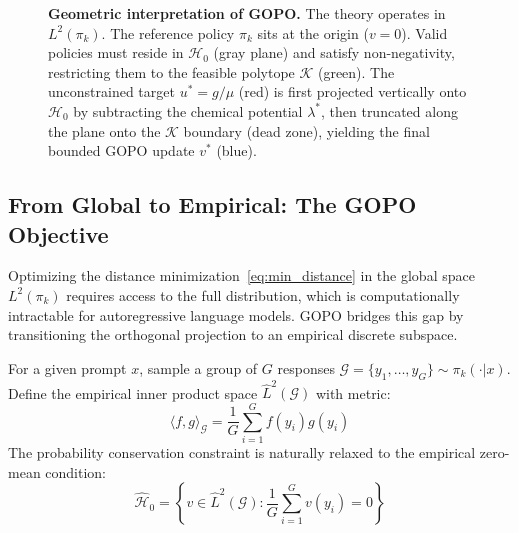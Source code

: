 \documentclass[11pt]{article}
\theoremstyle{definition}
\theoremstyle{remark}
\newcommand{\pik}{\pi_k}
\begin{document}
\begin{figure}[htbp]
\begin{tikzpicture}[
    tdplot_main_coords,
    scale=3.0,
    >=stealth,
    label_font/.style={font=\footnotesize},
    important_label/.style={font=\small\bfseries},
    callout/.style={thin, gray!50}
]
\end{tikzpicture}

\caption{\textbf{Geometric interpretation of GOPO.} The theory operates in $L^2(\pi_k)$. The reference policy $\pi_k$ sits at the origin ($v=0$). Valid policies must reside in $\mathcal{H}_0$ (gray plane) and satisfy non-negativity, restricting them to the feasible polytope $\mathcal{K}$ (green). The unconstrained target $u^* = g/\mu$ (red) is first projected vertically onto $\mathcal{H}_0$ by subtracting the chemical potential $\lambda^*$, then truncated along the plane onto the $\mathcal{K}$ boundary (dead zone), yielding the final bounded GOPO update $v^*$ (blue).}
\label{fig:gopo_geometry}
\end{figure}

\subsection{From Global to Empirical: The GOPO Objective}
\label{subsec:gopo}

Optimizing the distance minimization~\eqref{eq:min_distance} in the global space $L^2(\pik)$ requires access to the full distribution, which is computationally intractable for autoregressive language models. GOPO bridges this gap by transitioning the orthogonal projection to an empirical discrete subspace.

For a given prompt $x$, sample a group of $G$ responses $\mathcal{G} = \{y_1, \ldots, y_G\} \sim \pik(\cdot|x)$. Define the empirical inner product space $\hat{L}^2(\mathcal{G})$ with metric:
\begin{equation}
\label{eq:empirical_ip}
    \langle f, g \rangle_{\mathcal{G}} = \frac{1}{G}\sum_{i=1}^G f(y_i)g(y_i)
\end{equation}
The probability conservation constraint is naturally relaxed to the empirical zero-mean condition:
\begin{equation}
    \hat{\mathcal{H}}_0 = \left\{ v \in \hat{L}^2(\mathcal{G}) : \frac{1}{G}\sum_{i=1}^G v(y_i) = 0 \right\}
\end{equation}
\end{document}
